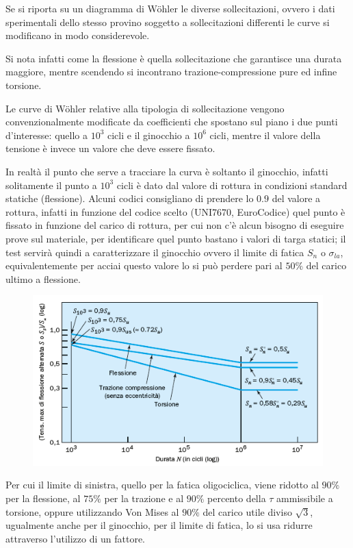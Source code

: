 			 Se si riporta su un diagramma di Wöhler le diverse sollecitazioni, ovvero i dati sperimentali dello stesso provino soggetto a sollecitazioni differenti le curve si modificano in modo considerevole. \newline
			 
			 Si nota infatti come la flessione è quella sollecitazione che garantisce una durata maggiore, mentre scendendo si incontrano trazione-compressione pure ed infine torsione. 
			 
			 Le curve di Wöhler relative alla tipologia di sollecitazione vengono convenzionalmente modificate da coefficienti che spostano sul piano i due punti d'interesse: quello a $10^3$ cicli e il ginocchio a $10^6$ cicli, mentre il valore della tensione è invece un valore che deve essere fissato.
			 
			 In realtà il punto che serve a tracciare la curva è soltanto il ginocchio, infatti solitamente il punto a $10^3$ cicli è dato dal valore di rottura in condizioni standard statiche (flessione). Alcuni codici consigliano di prendere lo $ 0.9 $ del valore a rottura, infatti in funzione del codice scelto (UNI7670, EuroCodice) quel punto è fissato in funzione del carico di rottura, per cui non c'è alcun bisogno di eseguire prove sul materiale, per identificare quel punto bastano i valori di targa statici; il test servirà quindi a caratterizzare il ginocchio ovvero il limite di fatica $ S_n $ o $\sigma_{la}$, equivalentemente per acciai questo valore lo si può perdere pari al $ 50\% $ del carico ultimo a flessione. 
			 
\begin{figure}[H]
	\centering
	\includegraphics[width=0.5\linewidth]{immagini_10/screenshot028}
	\label{fig:screenshot028}
\end{figure}			 
			 
			 Per cui il limite di sinistra, quello per la fatica oligociclica, viene ridotto al $ 90\% $ per la flessione, al $ 75\% $ per la trazione e al $ 90\% $ percento della $\tau$  ammissibile a torsione, oppure utilizzando Von Mises al $ 90\% $ del carico utile diviso $\sqrt{3}$, ugualmente anche per il ginocchio, per il limite di fatica, lo si usa ridurre attraverso l'utilizzo di un fattore.
			 
